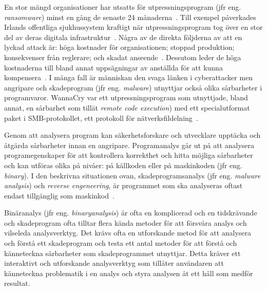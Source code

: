 En stor mängd organisationer har utsatts för utpressningsprogram (jfr eng.
\emph{ransomware}) minst en gång de senaste 24 månaderna~\cite{cyberreason2021,
    cyberreason2022}. Till exempel påverkades Irlands offentliga sjukhussystem
kraftigt när utpressningsprogram tog över en stor del av deras digitala
infrastruktur~\cite{hse_report, gallagher2023}.
Några av de direkta följderna av att en lyckad attack är: höga kostnader för
organisationen; stoppad produktion; konsekvenser från reglerare;
och skadat anseende~\cite{cyberreason2021, cyberreason2022}. Dessutom leder
de höga kostnaderna till bland annat uppsägningar av anställda för att kunna
kompensera~\cite{cyberreason2021, cyberreason2022}. I
många fall är människan den svaga länken i cyberattacker men angripare och
skadeprogram (jfr eng. \emph{malware}) utnyttjar också olika sårbarheter i
programvaror. WannaCry var ett utpressningsprogram som utnyttjade, bland annat,
en sårbarhet som tillät \emph{remote code execution}) med ett specialutformat
paket i SMB-protokollet, ett protokoll
för nätverksfildelning~\cite{alraddadicomprehensive}.


Genom att analysera program kan säkerhetsforskare och utvecklare upptäcka
och åtgärda sårbarheter innan en angripare. Programanalys går ut på att
analysera programegenskaper för att kontrollera korrekthet och hitta möjliga
sårbarheter och kan utföras olika på nivåer: på källkoden eller på maskinkoden
(jfr eng. \emph{binary}). I den beskrivna situationen ovan, skadeprogramsanalys
(jfr eng. \emph{malware analysis}) och \emph{reverse engeneering}, är
programmet som ska analyseras oftast endast tillgänglig som
maskinkod~\cite{andriesse2018}.

Binäranalys (jfr eng. \emph{binaryanalysis}) är ofta en komplicerad och en
tidskrävande och skadeprogram ofta tilltar flera kända metoder för att försvåra
analys och vilseleda analysverktyg. Det krävs ofta en utforskande metod för att
analysera och förstå ett skadeprogram och testa ett antal metoder för att
förstå och känneteckna sårbarheter som skadeprogrammet utnyttjar. Detta kräver
ett interaktivt och utforskande analysverktyg som tillåter användaren att
känneteckna problematik i en analys och styra analysen åt ett håll som medför
resultat.

